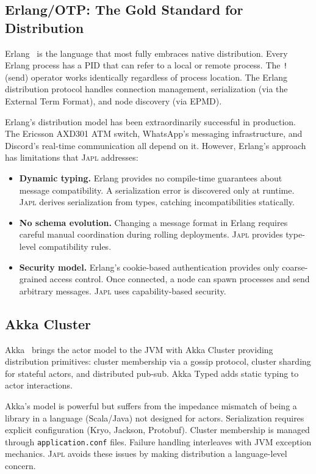 \documentclass[11pt,a4paper]{article}
\newcommand{\japl}{\textsc{Japl}}
\begin{document}
\subsection{Erlang/OTP: The Gold Standard for Distribution}

Erlang~\citep{armstrong2003making,virding1996concurrent} is the language that
most fully embraces native distribution. Every Erlang process has a PID that
can refer to a local or remote process. The \texttt{!} (send) operator works
identically regardless of process location. The Erlang distribution protocol
handles connection management, serialization (via the External Term Format),
and node discovery (via EPMD).

Erlang's distribution model has been extraordinarily successful in production.
The Ericsson AXD301 ATM switch, WhatsApp's messaging infrastructure, and
Discord's real-time communication all depend on it. However, Erlang's approach
has limitations that \japl{} addresses:

\begin{itemize}[nosep]
  \item \textbf{Dynamic typing.} Erlang provides no compile-time guarantees
        about message compatibility. A serialization error is discovered only
        at runtime. \japl{} derives serialization from types, catching
        incompatibilities statically.
  \item \textbf{No schema evolution.} Changing a message format in Erlang
        requires careful manual coordination during rolling deployments.
        \japl{} provides type-level compatibility rules.
  \item \textbf{Security model.} Erlang's cookie-based authentication provides
        only coarse-grained access control. Once connected, a node can spawn
        processes and send arbitrary messages. \japl{} uses capability-based
        security.
\end{itemize}

\subsection{Akka Cluster}

Akka~\citep{akka2009} brings the actor model to the JVM with Akka Cluster
providing distribution primitives: cluster membership via a gossip protocol,
cluster sharding for stateful actors, and distributed pub-sub. Akka Typed
adds static typing to actor interactions.

Akka's model is powerful but suffers from the impedance mismatch of being a
library in a language (Scala/Java) not designed for actors. Serialization
requires explicit configuration (Kryo, Jackson, Protobuf). Cluster membership
is managed through \texttt{application.conf} files. Failure handling
interleaves with JVM exception mechanics. \japl{} avoids these issues by
making distribution a language-level concern.
\end{document}
